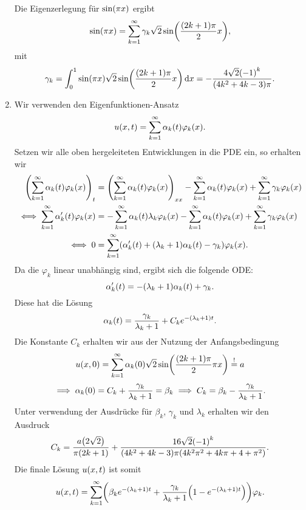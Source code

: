 \documentclass{exercise}
\begin{document}
\begin{enumerate}
\[        \]
        Die Eigenzerlegung für \(\sin\parentheses*{\pi x}\) ergibt
        \[
            \sin\parentheses*{\pi x} = \sum_{k = 1}^\infty \gamma_k \sqrt{2}\sin\parentheses*{\frac{\parentheses*{2k + 1}\pi}{2}x},
        \]
        mit
        \[
            \gamma_k = \int_0^1 \sin\parentheses*{\pi x}\sqrt{2}\sin\parentheses*{\frac{\parentheses*{2k + 1}\pi}{2}x}\d x = -\frac{4\sqrt{2}\parentheses*{-1}^k}{\parentheses*{4k^2 + 4k - 3}\pi}.
        \]
        \item Wir verwenden den Eigenfunktionen-Ansatz
        \[
            u\parentheses*{x, t} = \sum_{k = 1}^\infty \alpha_k\parentheses*{t} \varphi_k\parentheses*{x}.
        \]
        Setzen wir alle oben hergeleiteten Entwicklungen in die PDE ein, so erhalten wir
        \begin{align*}
            \parentheses*{\sum_{k = 1}^\infty \alpha_k\parentheses*{t}\varphi_k\parentheses*{x}}_t &= \parentheses*{\sum_{k = 1}^\infty \alpha_k\parentheses*{t}\varphi_k\parentheses*{x}}_{xx} - \sum_{k = 1}^\infty \alpha_k\parentheses*{t}\varphi_k\parentheses*{x} + \sum_{k = 1}^\infty \gamma_k\varphi_k\parentheses*{x}\\
            \iff \sum_{k = 1}^\infty \alpha_k'\parentheses*{t}\varphi_k\parentheses*{x} &= -\sum_{k = 1}^\infty \alpha_k\parentheses*{t}\lambda_k\varphi_k\parentheses*{x} - \sum_{k = 1}^\infty \alpha_k\parentheses*{t}\varphi_k\parentheses*{x} + \sum_{k = 1}^\infty \gamma_k\varphi_k\parentheses*{x}\\
            \iff 0 &= \sum_{k = 1}^\infty\parentheses*{\alpha_k'\parentheses*{t} + \parentheses*{\lambda_k + 1}\alpha_k\parentheses*{t} - \gamma_k}\varphi_k\parentheses*{x}.
        \end{align*}
        Da die \(\varphi_k\) linear unabhängig sind, ergibt sich die folgende ODE:
        \[
            \alpha_k'\parentheses*{t} = -\parentheses*{\lambda_k + 1}\alpha_k\parentheses*{t} + \gamma_k.
        \]
        Diese hat die Lösung
        \[
            \alpha_k\parentheses*{t} = \frac{\gamma_k}{\lambda_k + 1} + C_k e^{-\parentheses*{\lambda_k + 1}t}.
        \]
        Die Konstante \(C_k\) erhalten wir aus der Nutzung der Anfangsbedingung
        \[
            u\parentheses*{x, 0} = \sum_{k = 1}^\infty \alpha_k\parentheses*{0}\sqrt{2}\sin\parentheses*{\frac{\parentheses*{2k + 1}\pi}{2}\pi x} \stackrel{!}{=} a
        \]
        \[
            \implies \alpha_k\parentheses*{0} = C_k + \frac{\gamma_k}{\lambda_k + 1} = \beta_k \implies C_k = \beta_k - \frac{\gamma_k}{\lambda_k + 1}.
        \]
        Unter verwendung der Ausdrücke für \(\beta_k\), \(\gamma_k\) und \(\lambda_k\) erhalten wir den Ausdruck
        \[
            C_k = \frac{a\parentheses*{2\sqrt{2}}}{\pi\parentheses*{2k + 1}} + \frac{16\sqrt{2}\parentheses*{-1}^k}{\parentheses*{4k^2 + 4k - 3}\pi\parentheses*{4k^2 \pi^2 + 4k\pi + 4 + \pi^2}}.
        \]
        Die finale Lösung \(u\parentheses*{x, t}\) ist somit
        \[
            u\parentheses*{x, t} = \sum_{k = 1}^\infty\parentheses*{\beta_k e^{-\parentheses*{\lambda_k + 1}t} + \frac{\gamma_k}{\lambda_k + 1}\parentheses*{1 - e^{-\parentheses*{\lambda_k + 1}t}}}\varphi_k.
        \]
    \end{enumerate}
\end{document}

